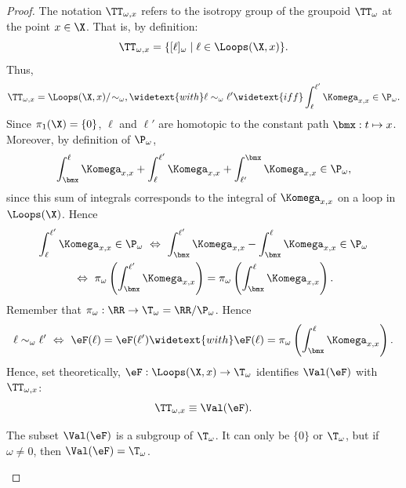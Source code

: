   \begin{proof}
    The notation $\TT_{\omega,x}$ refers to the isotropy group of the groupoid $\TT_\omega$ at the point $x \in \X$.
    That is,
    by definition:
    $$
      \TT_{\omega,x} = \{ [\ell]_\omega \mid \ell \in \Loops(\X,x) \}.
      $$
    Thus,
    $$
      \TT_{\omega,x} = \Loops(\X,x)/\!\sim_\omega,
      \widetext{with} \ell \sim_\omega \ell' \widetext{iff} \int_\ell^{\ell'} \Komega_{x,x} \in \P_\omega.
      $$
    Since $\pi_1(\X) = \{0\}$,
    $\ell$ and $\ell'$ are homotopic to the constant path $\bmx : t \mapsto x$.
    Moreover,
    by definition of $\P_\omega$,
    $$
      \int_{\bmx}^{\ell} \Komega_{x,x} + \int_{\ell}^{\ell'} \Komega_{x,x} + \int_{\ell'}^{\bmx} \Komega_{x,x} \in \P_\omega,
      $$
    since this sum of integrals corresponds to the integral of $\Komega_{x,x}$ on a loop in $\Loops(\X)$.
    Hence
    \begin{multline*}
      \int_{\ell}^{\ell'} \Komega_{x,x} \in \P_\omega
      \ \Leftrightarrow \
      \int_{\bmx}^{\ell'} \Komega_{x,x} - \int_{\bmx}^{\ell} \Komega_{x,x} \in \P_\omega \\
      \ \Leftrightarrow \
      \pi_\omega\left(\int_{\bmx}^{\ell'} \Komega_{x,x}\right) = \pi_\omega\left(\int_{\bmx}^{\ell} \Komega_{x,x}\right).
    \end{multline*}
    Remember that $\pi_\omega : \RR \to \T_\omega = \RR/\P_\omega$.
    Hence
    $$
      \ell \sim_\omega \ell' \ \Leftrightarrow \ \eF(\ell) = \eF(\ell')
      \widetext{with}
      \eF(\ell) = \pi_\omega\left(\int_{\bmx}^{\ell} \Komega_{x,x}\right).
      $$
    Hence,
    set theoretically,
    $\eF : \Loops(\X,x) \to \T_\omega$ identifies $\Val(\eF)$ with $\TT_{\omega,x}$:
    $$
      \TT_{\omega,x} \equiv \Val(\eF).
      $$
    \begin{lemma}{}
      The subset $\Val(\eF)$ is a subgroup of $\T_\omega$.
      It can only be $\{0\}$ or $\T_\omega$,
      but if $\omega \neq 0$,
      then $\Val(\eF) = \T_\omega$.
    \end{lemma}
    

\end{proof}
